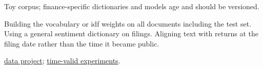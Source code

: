 \begin{qfmethod}
 Toy corpus; finance-specific dictionaries and models age and should be versioned.

 Building the vocabulary or idf weights on all documents including the test set. Using a general sentiment dictionary on filings. Aligning text with returns at the filing date rather than the time it became public.

 \hyperref[meth:data-analysis-project]{data project}; \hyperref[meth:time-valid-ml-experiment-record]{time-valid experiments}.

\end{qfmethod}
